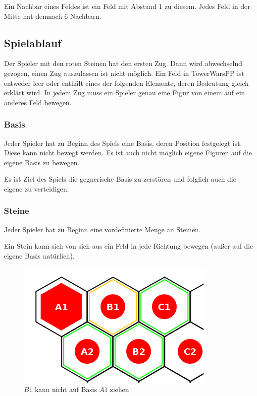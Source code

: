 Ein Nachbar eines Feldes ist ein Feld mit Abstand $1$ zu diesem. Jedes Feld in der Mitte hat demnach $6$ Nachbarn.

\subsection*{Spielablauf}
Der Spieler mit den roten Steinen hat den ersten Zug. Dann wird abwechselnd gezogen, einen Zug auszulassen ist nicht möglich. Ein Feld in TowerWarsPP ist entweder leer oder enthält eines der folgenden Elemente, deren Bedeutung gleich erklärt wird. In jedem Zug muss ein Spieler genau eine Figur von einem auf ein anderes Feld bewegen.

\subsubsection*{Basis}
Jeder Spieler hat zu Beginn des Spiels eine Basis, deren Position festgelegt ist. Diese kann nicht bewegt werden. Es ist auch nicht möglich eigene Figuren auf die eigene Basis zu bewegen.

Es ist Ziel des Spiels die gegnerische Basis zu zerstören und folglich auch die eigene zu verteidigen.

\subsubsection*{Steine}
Jeder Spieler hat zu Beginn eine vordefinierte Menge an Steinen. 

Ein Stein kann sich von sich aus ein Feld in jede Richtung bewegen (außer auf die eigene Basis natürlich).
\begin{figure}[ht]
\begin{center}
\includegraphics[scale=0.25]{graphic/token-nobase.png}
\end{center}
\caption*{$B1$ kann nicht auf Basis $A1$ ziehen}
\end{figure}

